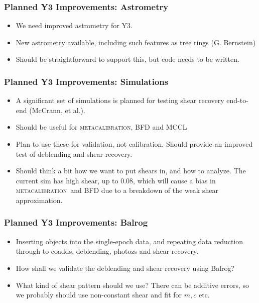 \documentclass{beamer}
\newcommand{\mcal}{\textsc{metacalibration}}
\begin{document}
\frame
{
    \frametitle{Planned Y3 Improvements: Astrometry}

    \begin{itemize}

        \item We need improved astrometry for Y3.

        \item New astrometry available, including such
            features as tree rings (G. Bernstein)

        \item Should be straightforward to support this,
            but code needs to be written.


    \end{itemize}

}

\frame
{
    \frametitle{Planned Y3 Improvements: Simulations}

    \begin{itemize}

        \item A significant set of simulations is planned
            for testing shear recovery end-to-end (McCrann, et al.).

        \item Should be useful for \mcal, BFD and MCCL

        \item Plan to use these for validation, not calibration.  
            Should provide an improved test of deblending and
            shear recovery.

        \item Should think a bit how we want to put shears in, and how to
            analyze.  The current sim has high shear, up to 0.08, which will
            cause a bias in \mcal\ and BFD due to a breakdown of the weak shear
            approximation.

    \end{itemize}

}

\frame
{
    \frametitle{Planned Y3 Improvements: Balrog}

    \begin{itemize}

        \item Inserting objects into the single-epoch data, and
            repeating data reduction through to coadds, 
            deblending, photozs and shear recovery.

        \item How shall we validate the deblending and shear recovery
            using Balrog?

        \item What kind of shear pattern should we use?  There can be
            additive errors, so we probably should use non-constant
            shear and fit for $m, c$ etc.


    \end{itemize}

}
\end{document}

